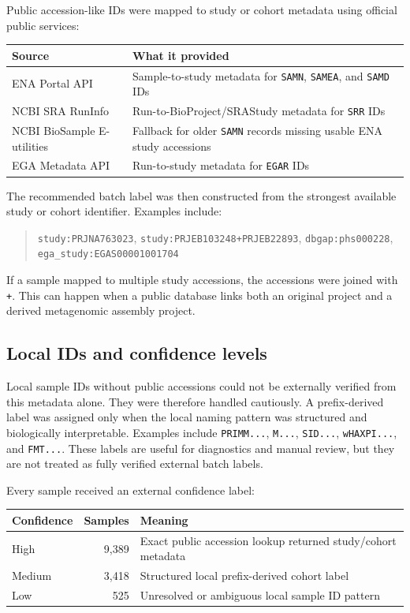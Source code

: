 \documentclass[11pt]{article}
\newcommand{\code}[1]{\texttt{\small #1}}
\begin{document}
Public accession-like IDs were mapped to study or cohort metadata using official public
services:

\begin{center}
\begin{tabular}{lp{}}
\toprule
Source & What it provided \\
\midrule
ENA Portal API & Sample-to-study metadata for \code{SAMN}, \code{SAMEA}, and \code{SAMD} IDs \\
NCBI SRA RunInfo & Run-to-BioProject/SRAStudy metadata for \code{SRR} IDs \\
NCBI BioSample E-utilities & Fallback for older \code{SAMN} records missing usable ENA study accessions \\
EGA Metadata API & Run-to-study metadata for \code{EGAR} IDs \\
\bottomrule
\end{tabular}
\end{center}

The recommended batch label was then constructed from the strongest available study or
cohort identifier. Examples include:

\begin{quote}
\code{study:PRJNA763023}, \code{study:PRJEB103248+PRJEB22893},
\code{dbgap:phs000228}, \code{ega\_study:EGAS00001001704}
\end{quote}

If a sample mapped to multiple study accessions, the accessions were joined with
\code{+}. This can happen when a public database links both an original project and a
derived metagenomic assembly project.

\subsection{Local IDs and confidence levels}

Local sample IDs without public accessions could not be externally verified from this
metadata alone. They were therefore handled cautiously. A prefix-derived label was
assigned only when the local naming pattern was structured and biologically
interpretable. Examples include \code{PRIMM...}, \code{M...}, \code{SID...},
\code{wHAXPI...}, and \code{FMT...}. These labels are useful for diagnostics and manual
review, but they are not treated as fully verified external batch labels.

Every sample received an external confidence label:

\begin{center}
\begin{tabular}{lrl}
\toprule
Confidence & Samples & Meaning \\
\midrule
High & 9,389 & Exact public accession lookup returned study/cohort metadata \\
Medium & 3,418 & Structured local prefix-derived cohort label \\
Low & 525 & Unresolved or ambiguous local sample ID pattern \\
\bottomrule
\end{tabular}
\end{center}
\end{document}
